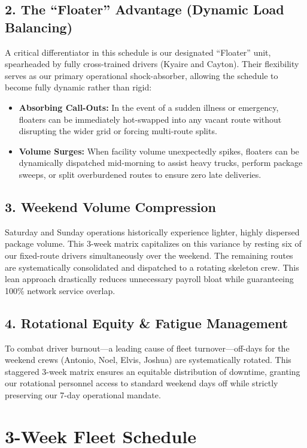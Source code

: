 \documentclass[11pt]{article}
\begin{document}
\subsection{2. The ``Floater'' Advantage (Dynamic Load Balancing)}
\label{sec:org248d0e6}
A critical differentiator in this schedule is our designated ``Floater'' unit, spearheaded by fully cross-trained drivers (Kyaire and Cayton). Their flexibility serves as our primary operational shock-absorber, allowing the schedule to become fully dynamic rather than rigid:
\begin{itemize}
\item \textbf{\textbf{Absorbing Call-Outs:}} In the event of a sudden illness or emergency, floaters can be immediately hot-swapped into any vacant route without disrupting the wider grid or forcing multi-route splits.
\item \textbf{\textbf{Volume Surges:}} When facility volume unexpectedly spikes, floaters can be dynamically dispatched mid-morning to assist heavy trucks, perform package sweeps, or split overburdened routes to ensure zero late deliveries.
\end{itemize}
\subsection{3. Weekend Volume Compression}
\label{sec:org63f0826}
Saturday and Sunday operations historically experience lighter, highly dispersed package volume. This 3-week matrix capitalizes on this variance by resting six of our fixed-route drivers simultaneously over the weekend. The remaining routes are systematically consolidated and dispatched to a rotating skeleton crew. This lean approach drastically reduces unnecessary payroll bloat while guaranteeing 100\% network service overlap.
\subsection{4. Rotational Equity \& Fatigue Management}
\label{sec:orgdd3cf2c}
To combat driver burnout—a leading cause of fleet turnover—off-days for the weekend crews (Antonio, Noel, Elvis, Joshua) are systematically rotated. This staggered 3-week matrix ensures an equitable distribution of downtime, granting our rotational personnel access to standard weekend days off while strictly preserving our 7-day operational mandate.

\newpage
\section{3-Week Fleet Schedule}
\label{sec:org143bbe5}
\end{document}

